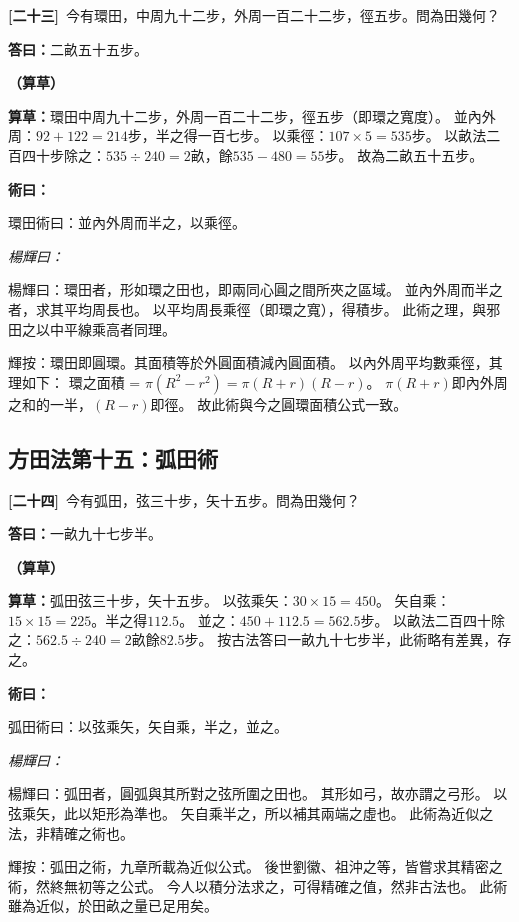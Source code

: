 \documentclass[11pt,a4paper]{article}
\newenvironment{method}{%
  \par\noindent\textcolor{methodcolor}{\textbf{術曰：}}%
  \ignorespaces
}{\par\vspace{0.5em}}
\newenvironment{caocao}{%
  \par\noindent\textcolor{caocaocolor}{\small\textbf{（算草）}}%
  \ignorespaces
}{\par\vspace{0.5em}}
\newenvironment{yanghuicomment}{%
  \par\noindent\textcolor{commentarycolor}{\small\textit{楊輝曰：}}%
  \ignorespaces
}{\par\vspace{0.5em}}
\newcommand{\problemnum}[1]{\textbf{[\ignorespaces#1\unskip]}}
\begin{document}
\noindent\problemnum{二十三}\,
今有環田，中周九十二步，外周一百二十二步，徑五步。問為田幾何？

\noindent\textcolor{answercolor}{\textbf{答曰：}}二畝五十五步。

\begin{caocao}
\textbf{算草：}環田中周九十二步，外周一百二十二步，徑五步（即環之寬度）。
並內外周：$92 + 122 = 214$步，半之得一百七步。
以乘徑：$107 \times 5 = 535$步。
以畝法二百四十步除之：$535 \div 240 = 2$畝，餘$535 - 480 = 55$步。
故為二畝五十五步。
\end{caocao}

\begin{method}
環田術曰：並內外周而半之，以乘徑。
\end{method}

\begin{yanghuicomment}
楊輝曰：環田者，形如環之田也，即兩同心圓之間所夾之區域。
並內外周而半之者，求其平均周長也。
以平均周長乘徑（即環之寬），得積步。
此術之理，與邪田之以中平線乘高者同理。

輝按：環田即圓環。其面積等於外圓面積減內圓面積。
以內外周平均數乘徑，其理如下：
環之面積 = $\pi(R^2 - r^2) = \pi(R+r)(R-r)$。
$\pi(R+r)$即內外周之和的一半，$(R-r)$即徑。
故此術與今之圓環面積公式一致。
\end{yanghuicomment}

\subsection{方田法第十五：弧田術}

\noindent\problemnum{二十四}\,
今有弧田，弦三十步，矢十五步。問為田幾何？

\noindent\textcolor{answercolor}{\textbf{答曰：}}一畝九十七步半。

\begin{caocao}
\textbf{算草：}弧田弦三十步，矢十五步。
以弦乘矢：$30 \times 15 = 450$。
矢自乘：$15 \times 15 = 225$。半之得$112.5$。
並之：$450 + 112.5 = 562.5$步。
以畝法二百四十除之：$562.5 \div 240 = 2$畝餘$82.5$步。
按古法答曰一畝九十七步半，此術略有差異，存之。
\end{caocao}

\begin{method}
弧田術曰：以弦乘矢，矢自乘，半之，並之。
\end{method}

\begin{yanghuicomment}
楊輝曰：弧田者，圓弧與其所對之弦所圍之田也。
其形如弓，故亦謂之弓形。
以弦乘矢，此以矩形為準也。
矢自乘半之，所以補其兩端之虛也。
此術為近似之法，非精確之術也。

輝按：弧田之術，九章所載為近似公式。
後世劉徽、祖沖之等，皆嘗求其精密之術，然終無初等之公式。
今人以積分法求之，可得精確之值，然非古法也。
此術雖為近似，於田畝之量已足用矣。
\end{yanghuicomment}
\end{document}
